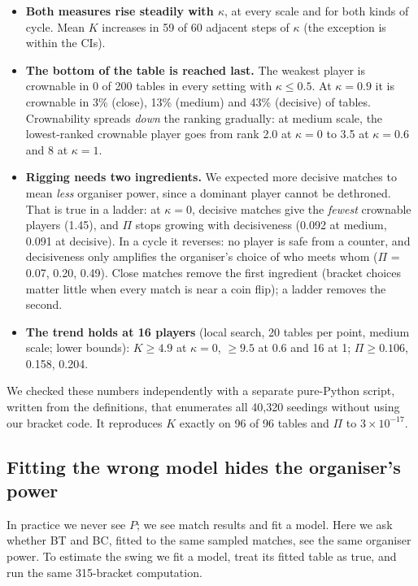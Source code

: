 \documentclass[11pt]{article}
\theoremstyle{remark}
\newcommand{\kap}{\kappa}
\begin{document}
\begin{itemize}
\item \textbf{Both measures rise steadily with $\kap$}, at every scale and for both kinds of cycle. Mean $K$ increases in 59 of
60 adjacent steps of $\kap$ (the exception is within the CIs).
\item \textbf{The bottom of the table is reached last.} The weakest player is crownable in 0 of 200 tables in every setting
with $\kap\le0.5$. At $\kap=0.9$ it is crownable in 3\% (close), 13\% (medium) and 43\% (decisive) of tables. Crownability
spreads \emph{down} the ranking gradually: at medium scale, the lowest-ranked crownable player goes from rank 2.0 at $\kap=0$
to 3.5 at $\kap=0.6$ and 8 at $\kap=1$.
\item \textbf{Rigging needs two ingredients.} We expected more decisive matches to mean \emph{less} organiser power, since a
dominant player cannot be dethroned. That is true in a ladder: at $\kap=0$, decisive matches give the \emph{fewest} crownable
players (1.45), and $\Pi$ stops growing with decisiveness (0.092 at medium, 0.091 at decisive). In a cycle it reverses: no
player is safe from a counter, and decisiveness only amplifies the organiser's choice of who meets whom ($\Pi$ = 0.07, 0.20,
0.49). Close matches remove the first ingredient (bracket choices matter little when every match is near a coin flip); a
ladder removes the second.
\item \textbf{The trend holds at 16 players} (local search, 20 tables per point, medium scale; lower bounds): $K\ge4.9$ at
$\kap=0$, $\ge9.5$ at $0.6$ and 16 at 1; $\Pi\ge0.106$, 0.158, 0.204.
\end{itemize}
We checked these numbers independently with a separate pure-Python script, written from the definitions, that enumerates all
40{,}320 seedings without using our bracket code. It reproduces $K$ exactly on 96 of 96 tables and $\Pi$ to $3\times10^{-17}$.

\subsection{Fitting the wrong model hides the organiser's power}
\label{sec:e2}
In practice we never see $P$; we see match results and fit a model. Here we ask whether BT and BC, fitted to the same
sampled matches, see the same organiser power. To estimate the swing we fit a model, treat its fitted table as true, and run
the same 315-bracket computation.
\end{document}
